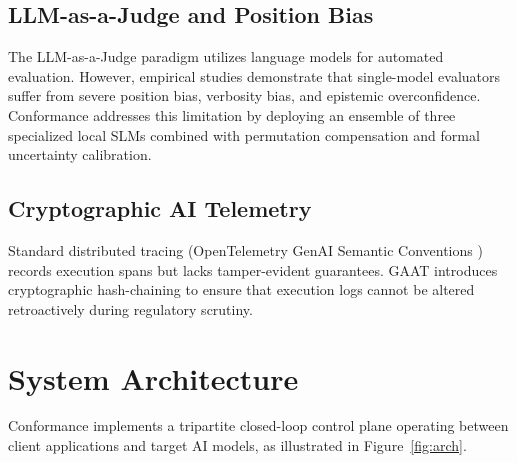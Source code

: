 \documentclass[conference,10pt]{IEEEtran}
\begin{document}
\subsection{LLM-as-a-Judge and Position Bias}
The LLM-as-a-Judge paradigm \cite{zheng2023judging} utilizes language models for automated evaluation. However, empirical studies demonstrate that single-model evaluators suffer from severe position bias, verbosity bias, and epistemic overconfidence. Conformance addresses this limitation by deploying an ensemble of three specialized local SLMs combined with permutation compensation and formal uncertainty calibration.

\subsection{Cryptographic AI Telemetry}
Standard distributed tracing (OpenTelemetry GenAI Semantic Conventions \cite{opentelemetry2024}) records execution spans but lacks tamper-evident guarantees. GAAT \cite{gaat2026} introduces cryptographic hash-chaining to ensure that execution logs cannot be altered retroactively during regulatory scrutiny.

\section{System Architecture}
\label{sec:arch}

Conformance implements a tripartite closed-loop control plane operating between client applications and target AI models, as illustrated in Figure~\ref{fig:arch}.
\end{document}
